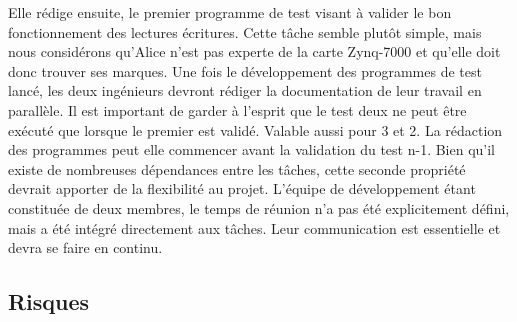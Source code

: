 Elle rédige ensuite, le premier programme de test visant à valider le bon fonctionnement des lectures écritures.
Cette tâche semble plutôt simple, mais nous considérons qu'Alice n'est pas experte de la carte Zynq-7000 et qu'elle doit donc trouver ses marques.
Une fois le développement des programmes de test lancé, les deux ingénieurs devront rédiger la documentation de leur travail en parallèle.
Il est important de garder à l'esprit que le test deux ne peut être exécuté que lorsque le premier est validé. 
Valable aussi pour 3 et 2.
La rédaction des programmes peut elle commencer avant la validation du test n-1.
Bien qu'il existe de nombreuses dépendances entre les tâches, cette seconde propriété devrait apporter de la flexibilité au projet.
L'équipe de développement étant constituée de deux membres, le temps de réunion n'a pas été explicitement défini, mais a été intégré directement aux tâches.
Leur communication est essentielle et devra se faire en continu.








\subsection{Risques}



